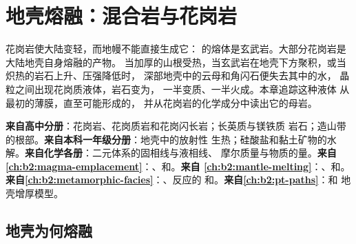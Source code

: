 \chapter{地壳熔融：混合岩与花岗岩}\label{ch:b2:crustal-melting}

花岗岩使大陆变轻，而地幔不能直接生成它：
的熔体是玄武岩。大部分花岗岩是大陆地壳自身熔融的产物。
当加厚的山根受热，当玄武岩在地壳下方聚积，或当炽热的岩石上升、压强降低时，
深部地壳中的云母和角闪石便失去其中的水，
晶粒之间出现花岗质液体，岩石变为，
一半变质、一半火成。本章追踪这种液体
从最初的薄膜，直至可能形成的，
并从花岗岩的化学成分中读出它的母岩。

\begin{recall}
\textbf{来自高中分册}：花岗岩、花岗质岩和花岗闪长岩；长英质与镁铁质
岩石；造山带的根部。\textbf{来自本科一年级分册}：地壳中的放射性
生热；硅酸盐和黏土矿物的水解。\textbf{来自化学各册}：二元体系的固相线与液相线、
摩尔质量与物质的量。\textbf{来自
\cref{ch:b2:magma-emplacement}}：、和。\textbf{来自
\cref{ch:b2:mantle-melting}}：、和。\textbf{来自\cref{ch:b2:metamorphic-facies}}：、反应的
和。\textbf{来自\cref{ch:b2:pt-paths}}：和
地壳增厚模型。
\end{recall}

\section{地壳为何熔融}\label{sec:b2:crustal-melting:why}

